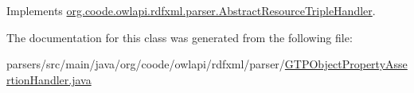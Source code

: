 Implements \hyperlink{classorg_1_1coode_1_1owlapi_1_1rdfxml_1_1parser_1_1_abstract_resource_triple_handler_acfa19ca318d5aaf7fc66e361ba02e7e8}{org.\-coode.\-owlapi.\-rdfxml.\-parser.\-Abstract\-Resource\-Triple\-Handler}.



The documentation for this class was generated from the following file\-:\begin{DoxyCompactItemize}
\item 
parsers/src/main/java/org/coode/owlapi/rdfxml/parser/\hyperlink{_g_t_p_object_property_assertion_handler_8java}{G\-T\-P\-Object\-Property\-Assertion\-Handler.\-java}\end{DoxyCompactItemize}
